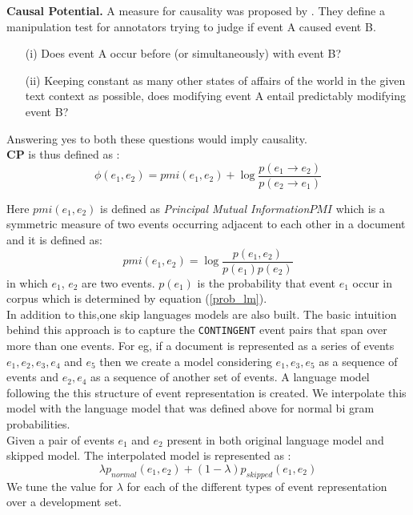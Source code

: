 \documentclass[12pt]{article}
\begin{document}
{\bf Causal Potential.} A measure for causality was proposed by \cite{cp}. They define a manipulation test for annotators trying to judge if event A caused event B. 
\begin{enumerate}
	\item[(i)] Does event A occur before (or simultaneously) with event B?
	\item[(ii)]  Keeping constant as many other states of affairs of the world in the given text context as possible, does modifying event A entail predictably modifying event B?
\end{enumerate}
Answering yes to both these questions would imply causality. \\
\textbf{CP} is thus defined as :
\begin{equation}
\phi(e_1,e_2) = pmi(e_1,e_2) + \log\frac{p(e_1 \rightarrow e_2)}{ p(e_2 \rightarrow e_1)} 
\end{equation}

Here $pmi(e_1,e_2)$ is defined as \textit{Principal Mutual Information\(PMI\)} which is a symmetric measure of two events occurring adjacent to each other in a document and it is defined as: 
\begin{equation}\label{pmi}
pmi(e_1,e_2) = \log\frac{p(e_1,e_2)}{p(e_1)p(e_2)}
\end{equation}
in which $e_1$, $e_2$ are two events. $p(e_1)$ is the probability that event $e_1$ occur in corpus which is determined by equation (\ref{prob_lm}). \\

In addition to this,one skip languages models are also built. The basic intuition behind this approach is to capture the \texttt{CONTINGENT} event pairs that span over more than one events. For eg, if a document is represented as a series of events $e_1, e_2, e_3, e_4$ and $e_5$ then we create a model considering $e_1, e_3, e_5$ as a sequence of events and $e_2, e_4$ as a sequence of another set of events. A language model following the this structure of event representation is created. We interpolate this model with the language model that was defined above for normal bi gram probabilities. \\
Given a pair of events $e_1$ and $e_2$ present in both original language model and skipped model. The interpolated model is represented as : 
\begin{equation}\label{weight}
	\lambda p_{normal}(e_1,e_2) + (1-\lambda) p_{skipped}(e_1,e_2)
\end{equation} 
We tune the value for $\lambda$ for each of the different types of event representation over a development set. \\
\end{document}
